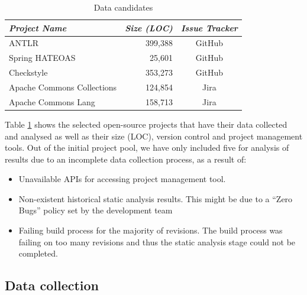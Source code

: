 \documentclass{mpaper}
\begin{document}
\begin{table}
	\begin{tabular}{|l|r|c|}
    \hline
		\emph{Project Name}        & \emph{Size (LOC)} & \emph{Issue Tracker}  \\ \hline \hline
		ANTLR                      & 399,388            & GitHub               \\ \hline
		Spring HATEOAS             & 25,601             & GitHub               \\ \hline
		Checkstyle                 & 353,273            & GitHub               \\ \hline
		Apache Commons Collections & 124,854            & Jira                 \\ \hline
		Apache Commons Lang        & 158,713            & Jira                 \\ \hline
	\end{tabular}
	\caption{\label{tab-data-candidates} Data candidates}
\end{table}

Table \ref{tab-data-candidates} shows the selected open-source projects that
have their data collected and analysed as well as their size (LOC), version
control and project management tools. Out of the initial project pool, we have
only included five for analysis of results due to an incomplete data collection
process, as a result of:

\begin{itemize}
  \item Unavailable APIs for accessing project management tool.
  \item Non-existent historical static analysis results. This might be due to a
  ``Zero Bugs'' policy set by the development team 
  \item Failing build process for the majority of revisions. The build process
  was failing on too many revisions and thus the static analysis stage could not
  be completed.
\end{itemize}

\subsection{Data collection}
\label{data-collection}
\end{document}
